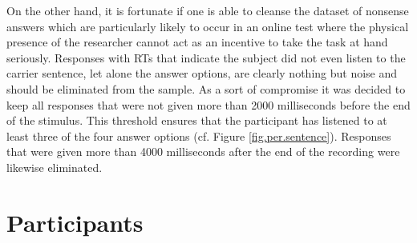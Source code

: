 On the other hand, it is fortunate if one is able to cleanse the dataset of nonsense answers which are particularly likely to occur in an online test where the physical presence of the researcher cannot act as an incentive to take the task at hand seriously.
Responses with RTs that indicate the subject did not even listen to the carrier sentence, let alone the answer options, are clearly nothing but noise and should be eliminated from the sample.
As a sort of compromise it was decided to keep all responses that were not given more than 2000 milliseconds before the end of the stimulus.
This threshold ensures that the participant has listened to at least three of the four answer options (cf. Figure \ref{fig.per.sentence}).
Responses that were given more than 4000 milliseconds after the end of the recording were likewise eliminated.

\section{Participants}\label{sec.perc_method.subjects}

